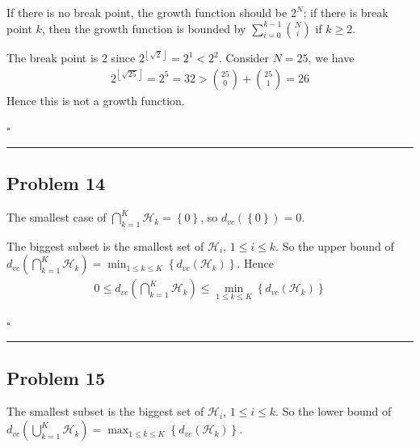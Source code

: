 \documentclass[12pt]{article}
\newcommand*{\QEDB}{\hfill\ensuremath{\square}}
\newcommand{\CBrackets}[1]{\left\{#1\right\}}
\newcommand{\ParTh}[1]{\left(#1\right)}
\newcommand{\Floor}[1]{\left\lfloor#1\right\rfloor}
\newcommand{\horrule}[1]{\rule{\linewidth}{#1}}
\begin{document}
If there is no break point, the growth function should be $2^N$; if there is break point $k$, then the growth function is bounded by $\sum_{i=0}^{k-1}\binom{N}{i}$ if $k\geq 2$.

The break point is 2 since $2^{\Floor{\sqrt{2}}}=2^1<2^2$. Consider $N=25$, we have
\begin{align}
2^{\Floor{\sqrt{25}}}=2^5=32>\binom{25}{0}+\binom{25}{1}=26
\end{align}
Hence this is not a growth function.

\QEDB

\horrule{0.5pt}

\subsection*{Problem 14}

The smallest case of $\bigcap^K_{k=1}\mathcal{H}_k=\CBrackets{0}$, so $d_{vc}\ParTh{\CBrackets{0}}=0$.

The biggest subset is the smallest set of $\mathcal{H}_i$, $1\leq i\leq k$. So the upper bound of $d_{vc}\ParTh{\bigcap^K_{k=1}\mathcal{H}_k}=\min_{1\leq k\leq K}\CBrackets{d_{vc}\ParTh{\mathcal{H}_k}}$. Hence
\begin{align}
0\leq d_{vc}\ParTh{\bigcap^K_{k=1}\mathcal{H}_k}\leq\min_{1\leq k\leq K}\CBrackets{d_{vc}\ParTh{\mathcal{H}_k}}
\end{align}

\QEDB

\horrule{0.5pt}

\subsection*{Problem 15}

The smallest subset is the biggest set of $\mathcal{H}_i$, $1\leq i\leq k$. So the lower bound of $d_{vc}\ParTh{\bigcup^K_{k=1}\mathcal{H}_k}=\max_{1\leq k\leq K}\CBrackets{d_{vc}\ParTh{\mathcal{H}_k}}$.
\end{document}
